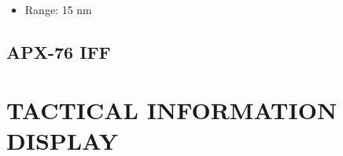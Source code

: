 \documentclass[fontSpartan]{TechCheck}
\begin{document}
\begin{longtableitemize}
{\begin{subitemize}
\begin{itemize}
				\item Range: 15 nm
			\end{itemize}
		\end{subitemize}}
	\end{longtableitemize}

	\subsection{APX-76 IFF}


	\cleardoublepage

	\section{TACTICAL INFORMATION DISPLAY}
\end{document}
